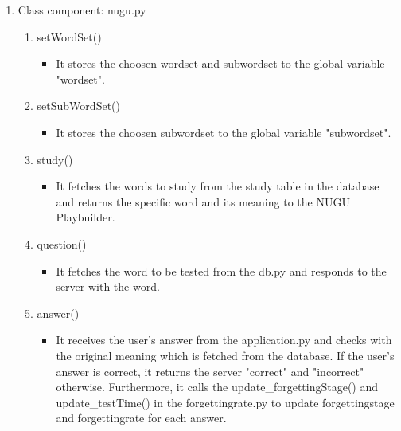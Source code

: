 \documentclass[conference]{IEEEtran}
\begin{document}
\begin{enumerate}
\begin{enumerate}
\begin{enumerate}
\begin{enumerate}
\begin{itemize}
                                        \end{itemize}
                            \end{enumerate}
                \item Class component: nugu.py
                    \begin{enumerate}
                        \item setWordSet()
                            \begin{itemize}
                                \item It stores the choosen wordset and subwordset to the global variable "wordset".
                            \end{itemize}
                        \item setSubWordSet()
                            \begin{itemize}
                                \item It stores the choosen subwordset to the global variable "subwordset".
                            \end{itemize}
                        \item study()
                            \begin{itemize}
                                \item It fetches the words to study from the study table in the database and returns the specific word and its meaning to the NUGU Playbuilder.
                            \end{itemize}
                        \item question()
                            \begin{itemize}
                                \item It fetches the word to be tested from the db.py and responds to the server with the word.
                            \end{itemize}
                        \item answer()
                            \begin{itemize}
                                \item It receives the user's answer from the application.py and checks with the original meaning which is fetched from the database. If the user's answer is correct, it returns the server "correct" and "incorrect" otherwise. Furthermore, it calls the update\_forgettingStage() and update\_testTime() in the forgettingrate.py to update forgettingstage and forgettingrate for each answer.

\end{itemize}
\end{enumerate}
\end{enumerate}
\end{enumerate}
\end{enumerate}
\end{document}
